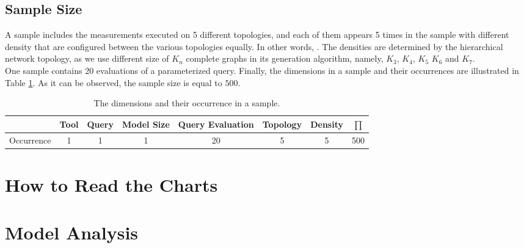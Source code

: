 \subsection{Sample Size}
A sample includes the measurements executed on 5 different topologies, and each of them appears 5 times in the sample with different density that are configured between the various topologies equally. In other words, . The densities are determined by the hierarchical network topology, as we use different size of $K_n$ complete graphs in its generation algorithm, namely, $K_3$, $K_4$, $K_5$ $K_6$ and $K_7$.\\
One sample contains 20 evaluations of a parameterized query. Finally, the dimensions in a sample and their occurrences are illustrated in Table \ref{tab:sample_size}. As it can be observed, the sample size is equal to $500$.

\begin{table}[ht]
	\footnotesize
	\centering
	
	\begin{tabular}{ l c c c c c c || c }
		\toprule
		 & Tool & Query & Model Size & Query Evaluation & Topology  & Density & $\prod$\\ [5pt] \hline
		Occurrence & 1 & 1 & 1 & 20 & 5 & 5 & 500 \\ \hline
		\bottomrule
	\end{tabular}
	\caption{The dimensions and their occurrence in a sample.}
	\label{tab:sample_size}
\end{table}



\section{How to Read the Charts}

\section{Model Analysis}

